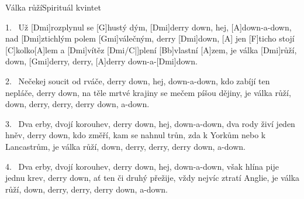 \begin{song}{Válka růží}{Spirituál kvintet}

\begin{xverse}{1.~}
Už [\large Dmi]rozplynul se [\large G]hustý dým, [\large Dmi]derry down, hej, [\large A]down-a-down,
nad [\large Dmi]ztichlým polem [\large Gmi]válečným, derry [\large Dmi]down, [\large A]{}
jen [\large F]ticho stojí [\large C]kolko[\large A]lem a [\large Dmi]vítěz [\large Dmi/C|]{plení} [\large Bb]vlastní [\large A]zem,
je válka [\large Dmi]růží, down, [\large Gmi]derry, derry, [\large A]derry down-a-[\large Dmi]down.
\end{xverse}


\begin{xverse}{2.~}
Nečekej soucit od rváče, derry down, hej, down-a-down,
kdo zabíjí ten nepláče, derry down,
na těle mrtvé krajiny se mečem píšou dějiny,
je válka růží, down, derry, derry, derry down, a-down.
\end{xverse}


\begin{xverse}{3.~}
Dva erby, dvojí korouhev, derry down, hej, down-a-down,
dva rody živí jeden hněv, derry down,
kdo změří, kam se nahnul trůn, zda k Yorkům nebo k Lancastrům,
je válka růží, down, derry, derry, derry down, a-down.
\end{xverse}


\begin{xverse}{4.~}
Dva erby, dvojí korouhev, derry down, hej, down-a-down,
však hlína pije jednu krev, derry down,
ať ten či druhý přežije, vždy nejvíc ztratí Anglie,
je válka růží, down, derry, derry, derry down, a-down.
\end{xverse}

\end{song}
\chords{ \chordDmiC }

